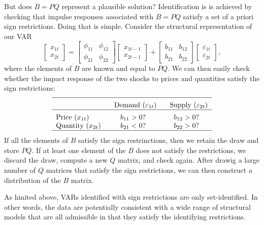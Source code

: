 \documentclass[10pt]{article}
\begin{document}
But does $B=PQ$ represent a plausible solution? Identification is is
achieved by checking that impulse responses associated with $B=PQ$ satisfy a
set of a priori sign restrictions. Doing that is simple. Consider the
structural representation of our VAR%
\begin{equation}
\left[ 
\begin{array}{c}
x_{1t} \\ 
x_{2t}%
\end{array}%
\right] =%
\begin{bmatrix}
\phi _{11} & \phi _{12} \\ 
\phi _{21} & \phi _{22}%
\end{bmatrix}%
\left[ 
\begin{array}{c}
x_{1t-1} \\ 
x_{2t-1}%
\end{array}%
\right] +\left[ 
\begin{array}{cc}
b_{11} & b_{12} \\ 
b_{21} & b_{22}%
\end{array}%
\right] 
\begin{bmatrix}
\varepsilon _{1t} \\ 
\varepsilon _{2t}%
\end{bmatrix}%
,  \label{eq:struct_var_sr}
\end{equation}%
where the elements of $B$ are known and equal to $PQ$. We can then easily
check whether the impact response of the two shocks to prices and quantities
satisfy the sign restrictions:%
\begin{equation*}
\begin{tabular}{lcc}
\hline
\addlinespace & $\text{Demand}$ ($\varepsilon _{1t}$) & $\text{Supply}$ ($%
\varepsilon _{2t}$) \\ \hline
\addlinespace Price ($x_{1t}$) & $b_{11}>0$? & $b_{12}>0$? \\ 
Quantity ($x_{2t}$) & $b_{21}<0$? & $b_{22}>0$? \\ \hline
\end{tabular}%
\end{equation*}%
If all the elements of $B$ satisfy the sign restrinctions, then we retain
the draw and store $PQ$. If at least one element of the $B$ does not satisfy
the restrictions, we discard the draw, compute a new $Q$ matrix, and check
again. After drawig a large number of $Q$ matrices that satisfy the sign
restrictions, we can then construct a distribution of the $B$ matrix.

As hinited above, VARs identified with sign restrictions are only
set-identified. In other words, the data are potentially consistent with a
wide range of structural models that are all admissible in that they satisfy
the identifying restrictions.
\end{document}
